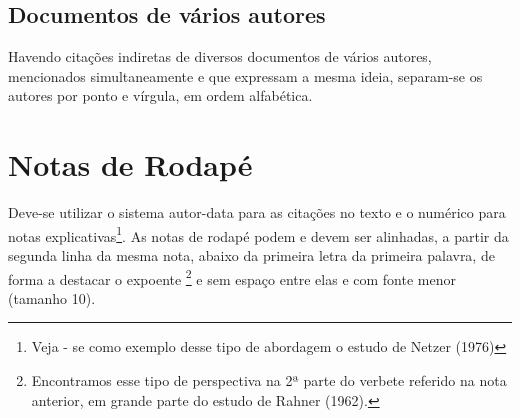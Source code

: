 
\cite{quatroautores}

\subsection{Documentos de vários autores}

Havendo    citações    indiretas de    diversos    documentos    de    vários    autores, mencionados  simultaneamente e  que  expressam  a  mesma  ideia,  separam-se  os  autores  por ponto e vírgula, em ordem alfabética.

\cite{tresautores, quatroautores}

\section{Notas de Rodap\'{e}}

Deve-se utilizar o sistema autor-data para as  citações no texto e o numérico para notas explicativas\footnote{Veja - se como exemplo desse tipo de abordagem o estudo de Netzer (1976)}. As notas de rodapé podem e devem ser alinhadas, a partir da segunda linha da mesma nota, abaixo da primeira letra da primeira palavra, de forma a destacar o expoente \footnote{Encontramos  esse  tipo  de  perspectiva  na  2ª  parte  do  verbete  referido  na  nota  anterior,  em  grande  parte  do estudo de Rahner (1962).} e sem espaço entre elas e com fonte menor (tamanho 10).

